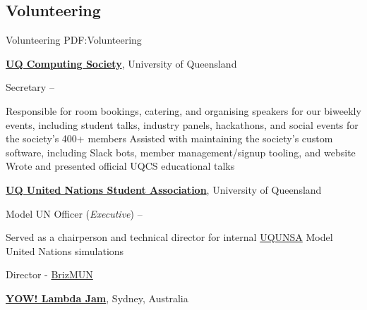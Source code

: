 \documentclass[a4paper,10pt,oneside]{article}
\begin{document}
\begin{minipage}[t][0pt]{\linewidth}
\begin{body}

\section
{Volunteering}
{Volunteering}
{PDF:Volunteering}

\href{https://uqcs.org.au/}
{\textbf{UQ Computing Society}}, University of Queensland

\par Secretary\hfill {} -- 

\begin{detail}
\BulletItem Responsible for room bookings, catering, and organising speakers for our biweekly events, including student talks, industry panels, hackathons, and social events for the society's 400+ members
\BulletItem Assisted with maintaining the society's custom software, including Slack bots, member management/signup tooling, and website
\BulletItem Wrote and presented official UQCS educational talks
\end{detail}

\EntryGap

\href{http://www.unsauq.org/}
{\textbf{UQ United Nations Student Association}}, University of Queensland

\par Model UN Officer (\textit{Executive})\hfill {} -- 

\begin{detail}
\BulletItem Served as a chairperson and technical director for internal \href{http://www.unsauq.org/}{UQUNSA} Model United Nations simulations 
\end{detail}

\par Director - \href{http://www.brizmun.com/}{BrizMUN} \hfill {}

\EntryGap

\href{http://lambdajam.yowconference.com.au/}
{\textbf{YOW! Lambda Jam}}, Sydney, Australia  


\end{body}
\end{minipage}
\end{document}
